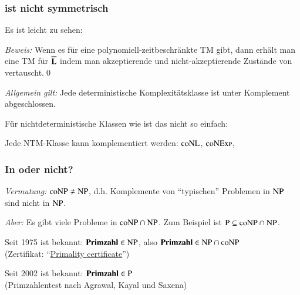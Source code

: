 \documentclass[onlymath]{beamer}
\begin{document}
\begin{frame}\frametitle{ ist nicht symmetrisch}

Es ist leicht zu sehen:


\emph{Beweis:} Wenn es für  eine polynomiell-zeitbeschränkte TM 
gibt, dann erhält man eine TM für $\overline{\textbf{\textcolor{black}{L}}}$ indem man akzeptierende
und nicht-akzeptierende Zustände von  vertauscht.\qed\medskip

\emph{Allgemein gilt:} Jede deterministische Komplexitätsklasse ist unter Komplement abgeschlossen.

\bigskip\pause

Für nichtdeterministische Klassen wie  ist das nicht so einfach:

\medskip\pause


Jede NTM-Klasse kann komplementiert werden: ${\textsc{coNL}}$, ${\textsc{coNExp}}$, \ghost{\ldots}

\end{frame}

\begin{frame}\frametitle{In  oder nicht?}

\emph{Vermutung:} ${\textsc{coNP}}\neq{\textsc{NP}}$, d.h. Komplemente von
"`typischen"' Problemen in ${\textsc{NP}}$ sind nicht in ${\textsc{NP}}$.
\bigskip

\emph{Aber:} Es gibt viele Probleme in ${\textsc{coNP}}\cap{\textsc{NP}}$. Zum Beispiel
ist ${\textsc{P}}\subseteq{\textsc{coNP}}\cap{\textsc{NP}}$.
\bigskip\pause

\pause

Seit 1975 ist bekannt: $\textbf{\textcolor{black}{Primzahl}}\in{\textsc{NP}}$, also
$\textbf{\textcolor{black}{Primzahl}}\in{\textsc{NP}}\cap{\textsc{coNP}}$\\
(Zertifikat: "`\href{https://en.wikipedia.org/wiki/Primality_certificate}{Primality certificate}"')
\bigskip\pause

Seit 2002 ist bekannt: $\textbf{\textcolor{black}{Primzahl}}\in{\textsc{P}}$\\
(Primzahlentest nach Agrawal, Kayal und Saxena)


\end{frame}
\end{document}

